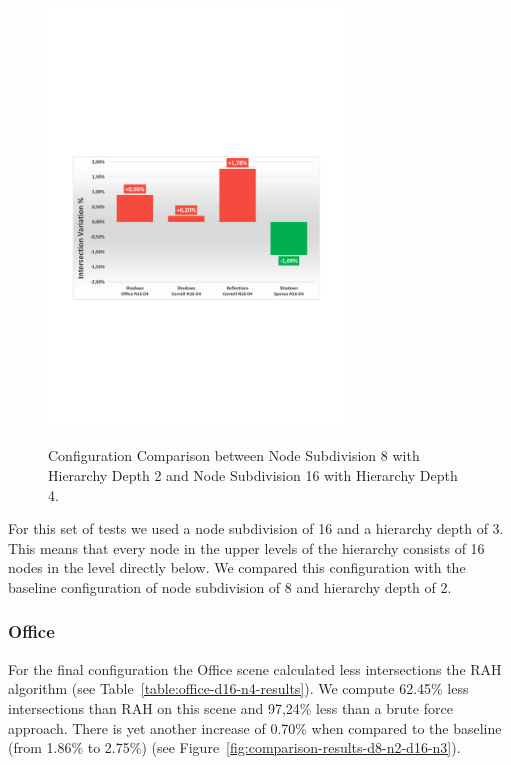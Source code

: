 \begin{figure}[!htb]
    \begin{center}
    \includegraphics[width=0.70\textwidth]{Images/Chart_Comparison_N8_D2_N16_D4}
    \label{fig:comparison-results-d8-n2-d16-n4}
    \caption{Configuration Comparison between Node Subdivision 8 with Hierarchy Depth 2 and Node Subdivision 16 with Hierarchy Depth 4.}
    \end{center}
\end{figure}

For this set of tests we used a node subdivision of 16 and a hierarchy depth of 3. This means that every node in the upper levels of the hierarchy consists of 16 nodes in the level directly below. We compared this configuration with the baseline configuration of node subdivision of 8 and hierarchy depth of 2.

\subsubsection{Office}

For the final configuration the Office scene calculated less intersections the RAH algorithm (see Table~\ref{table:office-d16-n4-results}). We compute 62.45\% less intersections than RAH on this scene and 97,24\% less than a brute force approach. There is yet another increase of 0.70\% when compared to the baseline (from 1.86\% to 2.75\%) (see Figure~\ref{fig:comparison-results-d8-n2-d16-n3}). 

